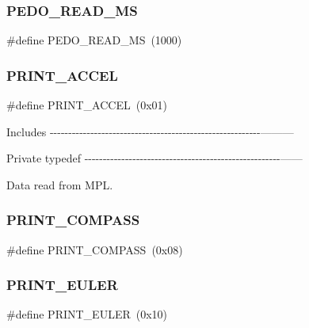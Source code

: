 \mbox{\label{group__e_m_p_l_ga77888d9bc269c75d63baf58cd000c7d9}} 
\subsubsection{P\+E\+D\+O\+\_\+\+R\+E\+A\+D\+\_\+\+MS}
{\footnotesize\ttfamily \#define P\+E\+D\+O\+\_\+\+R\+E\+A\+D\+\_\+\+MS~(1000)}

\mbox{\label{group__e_m_p_l_ga83c044582a9fec2e45f8858efa5885b8}} 
\subsubsection{P\+R\+I\+N\+T\+\_\+\+A\+C\+C\+EL}
{\footnotesize\ttfamily \#define P\+R\+I\+N\+T\+\_\+\+A\+C\+C\+EL~(0x01)}

Includes -\/-\/-\/-\/-\/-\/-\/-\/-\/-\/-\/-\/-\/-\/-\/-\/-\/-\/-\/-\/-\/-\/-\/-\/-\/-\/-\/-\/-\/-\/-\/-\/-\/-\/-\/-\/-\/-\/-\/-\/-\/-\/-\/-\/-\/-\/-\/-\/-\/-\/-\/-\/-\/-\/-\/-\/-\/---------

Private typedef -\/-\/-\/-\/-\/-\/-\/-\/-\/-\/-\/-\/-\/-\/-\/-\/-\/-\/-\/-\/-\/-\/-\/-\/-\/-\/-\/-\/-\/-\/-\/-\/-\/-\/-\/-\/-\/-\/-\/-\/-\/-\/-\/-\/-\/-\/-\/-\/-\/-\/-\/-\/-\/------

Data read from M\+PL. \mbox{\label{group__e_m_p_l_gae55039e3cf38b78e1ec327c3e81d2859}} 
\subsubsection{P\+R\+I\+N\+T\+\_\+\+C\+O\+M\+P\+A\+SS}
{\footnotesize\ttfamily \#define P\+R\+I\+N\+T\+\_\+\+C\+O\+M\+P\+A\+SS~(0x08)}

\mbox{\label{group__e_m_p_l_gabfb66b3aafb997de9897c558dfc34b8e}} 
\subsubsection{P\+R\+I\+N\+T\+\_\+\+E\+U\+L\+ER}
{\footnotesize\ttfamily \#define P\+R\+I\+N\+T\+\_\+\+E\+U\+L\+ER~(0x10)}

